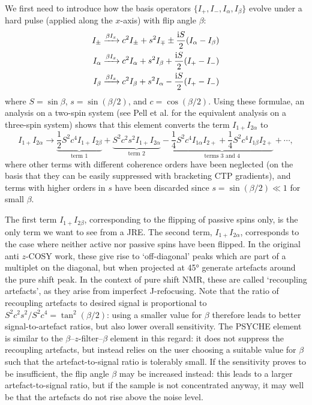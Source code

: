 We first need to introduce how the basis operators $\{I_+, I_-, I_\alpha, I_\beta\}$ evolve under a hard pulse (applied along the $x$-axis) with flip angle $\beta$:
\begin{align}
    I_{\pm} &\xrightarrow{\beta I_x} c^2 I_{\pm} + s^2I_{\mp} \pm \frac{\mathrm{i} S}{2}(I_\alpha - I_\beta) \label{eq:ipm_beta_evolution} \\
    I_{\alpha} &\xrightarrow{\beta I_x} c^2 I_{\alpha} + s^2I_{\beta} + \frac{\mathrm{i} S}{2}(I_+ - I_-) \label{eq:ialpha_beta_evolution} \\
    I_{\beta} &\xrightarrow{\beta I_x} c^2 I_{\beta} + s^2I_{\alpha} - \frac{\mathrm{i} S}{2}(I_+ - I_-) \label{eq:ibeta_beta_evolution}
\end{align}
where $S = \sin\beta$, $s = \sin(\beta/2)$, and $c = \cos(\beta/2)$.
Using these formulae, an analysis on a two-spin system (see Pell et al. for the equivalent analysis on a three-spin system) shows that this element converts the term $I_{1+}I_{2\alpha}$ to
\begin{equation}
    \label{eq:anti_z_cosy_transitions}
    I_{1+}I_{2\alpha} \longrightarrow
    {\underbrace{\frac{1}{2}S^2c^4 I_{1+}I_{2\beta}}_\text{term 1}}
    + {\underbrace{S^2c^2s^2I_{1+}I_{2\alpha}}_{\text{term 2}}}
    - {\underbrace{\frac{1}{4}S^2c^4I_{1\alpha}I_{2+}
    + \frac{1}{4}S^2c^4I_{1\beta}I_{2+}}_{\text{terms 3 and 4}}}
    + \cdots,
\end{equation}
where other terms with different coherence orders have been neglected (on the basis that they can be easily suppressed with bracketing CTP gradients), and terms with higher orders in $s$ have been discarded since $s = \sin(\beta/2) \ll 1$ for small $\beta$.

The first term $I_{1+}I_{2\beta}$, corresponding to the flipping of passive spins only, is the only term we want to see from a JRE.
The second term, $I_{1+}I_{2\alpha}$, corresponds to the case where neither active nor passive spins have been flipped.
In the original anti $z$-COSY work, these give rise to `off-diagonal' peaks which are part of a multiplet on the diagonal, but when projected at \ang{45} generate artefacts around the pure shift peak.
In the context of pure shift NMR, these are called `recoupling artefacts', as they arise from imperfect J-refocusing.
Note that the ratio of recoupling artefacts to desired signal is proportional to $S^2c^2s^2/S^2c^4 = \tan^2(\beta/2)$: using a smaller value for $\beta$ therefore leads to better signal-to-artefact ratios, but also lower overall sensitivity.
The PSYCHE element is similar to the $\beta$--$z$-filter--$\beta$ element in this regard: it does not suppress the recoupling artefacts, but instead relies on the user choosing a suitable value for $\beta$ such that the artefact-to-signal ratio is tolerably small.
If the sensitivity proves to be insufficient, the flip angle $\beta$ may be increased instead: this leads to a larger artefact-to-signal ratio, but if the sample is not concentrated anyway, it may well be that the artefacts do not rise above the noise level.%

